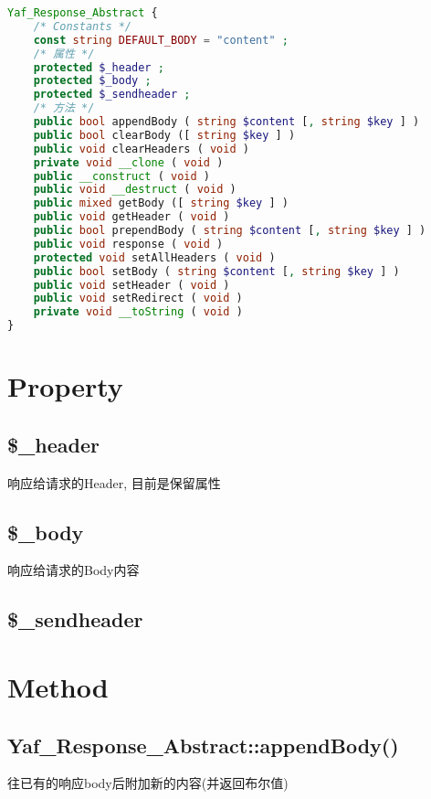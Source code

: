 \begin{lstlisting}[language=PHP]
Yaf_Response_Abstract {
    /* Constants */
    const string DEFAULT_BODY = "content" ;
    /* 属性 */
    protected $_header ;
    protected $_body ;
    protected $_sendheader ;
    /* 方法 */
    public bool appendBody ( string $content [, string $key ] )
    public bool clearBody ([ string $key ] )
    public void clearHeaders ( void )
    private void __clone ( void )
    public __construct ( void )
    public void __destruct ( void )
    public mixed getBody ([ string $key ] )
    public void getHeader ( void )
    public bool prependBody ( string $content [, string $key ] )
    public void response ( void )
    protected void setAllHeaders ( void )
    public bool setBody ( string $content [, string $key ] )
    public void setHeader ( void )
    public void setRedirect ( void )
    private void __toString ( void )
}
\end{lstlisting}

\section{Property}


\subsection{\$\_header}

响应给请求的Header, 目前是保留属性

\subsection{\$\_body}

响应给请求的Body内容
\subsection{\$\_sendheader}

\section{Method}


\subsection{Yaf\_Response\_Abstract::appendBody()}




往已有的响应body后附加新的内容(并返回布尔值)



